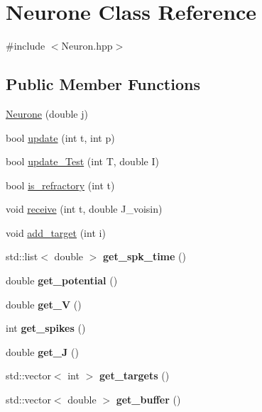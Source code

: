 \hypertarget{classNeurone}{\section{Neurone Class Reference}
\label{classNeurone}
}


{\ttfamily \#include $<$Neuron.\-hpp$>$}

\subsection*{Public Member Functions}
\begin{DoxyCompactItemize}
\item 
\hyperlink{classNeurone_a3eab5c3fa0164913da16e1e354849ea7}{Neurone} (double j)
\item 
bool \hyperlink{classNeurone_addbeb2fe298cf13c7b1e8bc0aba53ce4}{update} (int t, int p)
\item 
bool \hyperlink{classNeurone_aed76b3fbab95c21e6b117b6b845a6379}{update\-\_\-\-Test} (int T, double I)
\item 
bool \hyperlink{classNeurone_a61ced8282c8b2ebca2c2a04aee895098}{is\-\_\-refractory} (int t)
\item 
void \hyperlink{classNeurone_a261fa4e7a44a4b4b3d1ec619189614cd}{receive} (int t, double J\-\_\-voisin)
\item 
void \hyperlink{classNeurone_a6b6e73b4937fed000c5853c1c0e9bfd0}{add\-\_\-target} (int i)
\item 
\hypertarget{classNeurone_acc9fdbb5892f8dfee10d7dd06859278e}{std\-::list$<$ double $>$ {\bfseries get\-\_\-spk\-\_\-time} ()}\label{classNeurone_acc9fdbb5892f8dfee10d7dd06859278e}

\item 
\hypertarget{classNeurone_a119a9b1cd5a1bae9bac565e3d61cbadb}{double {\bfseries get\-\_\-potential} ()}\label{classNeurone_a119a9b1cd5a1bae9bac565e3d61cbadb}

\item 
\hypertarget{classNeurone_a4d6cfa1a764a9fae24f54bd327503669}{double {\bfseries get\-\_\-\-V} ()}\label{classNeurone_a4d6cfa1a764a9fae24f54bd327503669}

\item 
\hypertarget{classNeurone_abe296dabc892cce87fe27d61045192d5}{int {\bfseries get\-\_\-spikes} ()}\label{classNeurone_abe296dabc892cce87fe27d61045192d5}

\item 
\hypertarget{classNeurone_a0571ccbb1a1f26ffcb6bf50091520544}{double {\bfseries get\-\_\-\-J} ()}\label{classNeurone_a0571ccbb1a1f26ffcb6bf50091520544}

\item 
\hypertarget{classNeurone_af4096808a1819a5dc01be850a89d0aae}{std\-::vector$<$ int $>$ {\bfseries get\-\_\-targets} ()}\label{classNeurone_af4096808a1819a5dc01be850a89d0aae}

\item 
\hypertarget{classNeurone_aea13a07351b8c1bbc333b2df6247c1f0}{std\-::vector$<$ double $>$ {\bfseries get\-\_\-buffer} ()}\label{classNeurone_aea13a07351b8c1bbc333b2df6247c1f0}

\end{DoxyCompactItemize}


